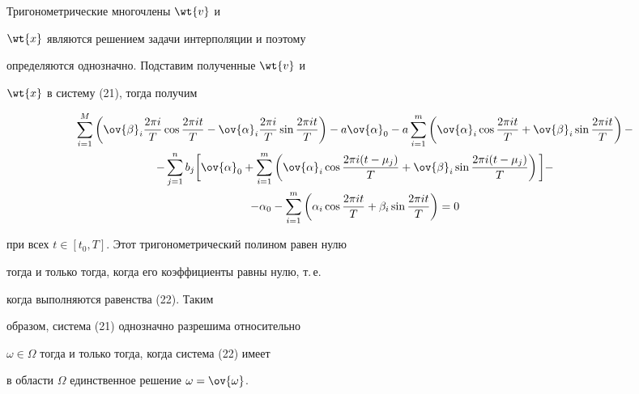 \begin{pf}


Тригонометрические многочлены $\wt{v}$ и


$\wt{x}$ являются решением задачи интерполяции и поэтому


определяются однозначно. Подставим полученные $\wt{v}$ и


$\wt{x}$ в систему (21), тогда получим


\begin{multline*}


\sum\limits^M_{i=1}\left(\ov{\beta}_i\frac{2\pi i}{T}


\cos\frac{2\pi it}{T}-\ov{\alpha}_i\frac{2\pi i}{T}


\sin\frac{2\pi it}{T}\right) -a\ov{\alpha}_0 -


a\sum\limits^m_{i=1}\left(\ov{\alpha}_i \cos\frac{2\pi it}{T} +


\ov{\beta}_i \sin\frac{2\pi it}{T}\right) - \\


%


-\sum\limits^n_{j=1}b_j\bigg[\ov{\alpha}_0 +


\sum\limits^m_{i=1}\left(\ov{\alpha}_i\cos\frac{2\pi


i(t-\mu_j)}{T} + \ov{\beta}_i \sin\frac{2\pi


i(t-\mu_j)}{T}\right)\bigg] - \\


%


- \alpha_0 - \sum\limits^m_{i=1}\left(\alpha_i \cos\frac{2\pi


it}{T} + \beta_i \sin\frac{2\pi it}{T}\right) = 0


\end{multline*}


при всех $t\in[t_0,T]$. Этот тригонометрический полином равен нулю


тогда и только тогда, когда его коэффициенты равны нулю, т.\,е.


когда выполняются равенства (22). Таким


образом, система (21) однозначно разрешима относительно


$\omega\in\Omega$ тогда и только тогда, когда система (22) имеет


в области $\Omega$ единственное решение $\omega=\ov{\omega}$.


\end{pf}





